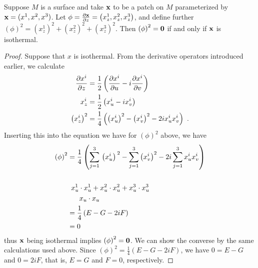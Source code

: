   \begin{lem}
    Suppose $M$ is a surface and take $\mathbf{x}$ to be a patch on $M$ parameterized by $\mathbf{x} = (x^1, x^2, x^3)$. Let $\phi = \frac{\partial \mathbf{x}}{\partial z} = \left(x_z^1, x_z^2, x_z^3\right)$, and define further $\left(\phi\right)^2 = \left(x_z^1\right)^2 + \left(x_z^2\right)^2 + \left(x_z^3\right)^2$. Then $\left(\phi\right)^2 = \mathbf{0}$ if and only if $\mathbf{x}$ is isothermal.
  \end{lem}
  \begin{proof}
    Suppose that $x$ is isothermal. From the derivative operators introduced earlier, we calculate
    \begin{align*}
      \frac{\partial x^i}{\partial z} &= \frac{1}{2}\left(\frac{\partial x^i}{\partial u} - i\frac{\partial x^i}{\partial v}\right)\\
      x^i_z &= \frac{1}{2}\left(x^i_u - ix^i_v\right)\\
      \left(x^i_z\right)^2 &= \frac{1}{4}\left(\left(x_u^i\right)^2 - \left(x_v^i\right)^2 - 2ix_u^ix_v^i\right) \ .
    \end{align*}
    Inserting this into the equation we have for $\left(\phi\right)^2$ above, we have
    \begin{align*}
      \left(\phi\right)^2 &= \frac{1}{4}\left(\sum_{j = 1}^3 {\tikzmark{tleft}{}\left(x_u^i\right)\tikzmark{tright}{}}^2 - \sum_{j = 1}^3 \left(x_v^i\right)^2 - 2i\sum_{j = 1}^3 x_u^i x_v^i\right)\\
      &\\
      &\,\,\,\tikzmark{nleft}{}x_u^1\cdot x_u^1 + x_u^2\cdot x_u^2 + x_u^3\cdot x_u^3\tikzmark{nright}{}\\
      &\,\,\,\,\,\,\,\,\,\,\tikzmark{nnleft}{}x_u \cdot x_u\tikzmark{nnright}{}\\
      &= \frac{1}{4}\left(\tikzmark{bleft}{}E\tikzmark{bright}{} - G - 2iF\right)\\
      &= 0
    \end{align*}
    thus $\mathbf{x}$ being isothermal implies $\left(\phi\right)^2 = \mathbf{0}$. We can show the converse by the same calculations used above. Since $\left(\phi\right)^2 = \frac{1}{4}(E - G - 2iF)$, we have $0 = E - G$ and $0 = 2iF$, that is, $E = G$ and $F = 0$, respectively.
  \end{proof}

